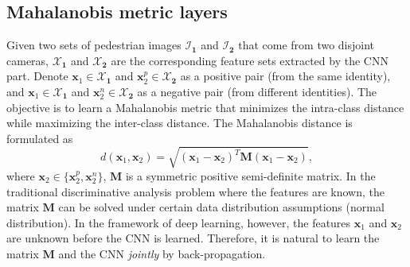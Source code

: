 \documentclass[10pt,twocolumn,letterpaper]{article}
\begin{document}
\subsection{Mahalanobis metric layers}
\label{section_Mahalanobis_metric_layers}

Given two sets of pedestrian images $\mathcal{I}_\mathbf{1}$ and $\mathcal{I}_\mathbf{2}$ that come from two disjoint cameras,
$\mathcal{X}_\mathbf{1}$ and $\mathcal{X}_\mathbf{2}$ are the corresponding feature sets extracted by the CNN part.
Denote $\mathbf{x}_1\in\mathcal{X}_\mathbf{1}$ and $\mathbf{x}_2^p\in\mathcal{X}_\mathbf{2}$ as a positive pair (from the same identity), and $\mathbf{x}_1\in\mathcal{X}_\mathbf{1}$ and $\mathbf{x}_2^n\in\mathcal{X}_\mathbf{2}$ as a negative pair (from different identities).
The objective is to learn a Mahalanobis metric that minimizes the intra-class distance while maximizing the inter-class distance.
The Mahalanobis distance is formulated as
\begin{equation}\label{M-dist}
    d(\mathbf{x}_1, \mathbf{x}_2) = \sqrt{ (\mathbf{x}_1 - \mathbf{x}_2)^T \textbf{M} (\mathbf{x}_1 - \mathbf{x}_2) },
\end{equation}
where $\mathbf{x}_2 \in \{\mathbf{x}_2^p,\mathbf{x}_2^n\}$, $\textbf{M}$ is a symmetric positive semi-definite matrix.
In the traditional discriminative analysis problem where the features are known, the matrix $\textbf{M}$ can be solved under certain data distribution assumptions (\eg normal distribution).
In the framework of deep learning, however, the features $\mathbf{x}_1$ and $\mathbf{x}_2$ are unknown before the CNN is learned.
Therefore, it is natural to learn the matrix $\textbf{M}$ and the CNN \emph{jointly} by back-propagation.
\end{document}
